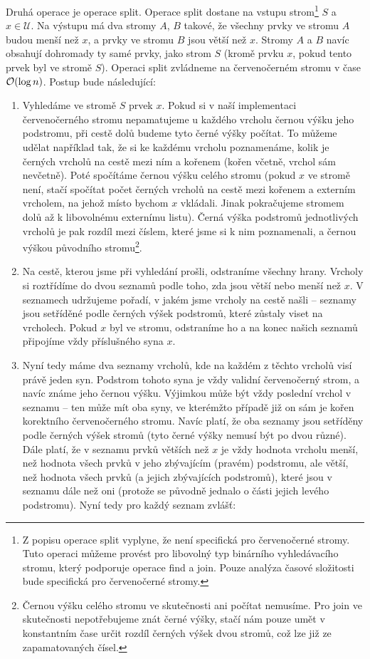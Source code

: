 Druhá operace je operace split. Operace split dostane na vstupu strom\footnote{Z popisu operace split vyplyne, že není specifická pro červenočerné stromy. Tuto operaci můžeme provést pro libovolný typ binárního vyhledávacího stromu, který podporuje operace find a join. Pouze analýza časové složitosti bude specifická pro červenočerné stromy.} $S$ a $x\in \mathcal U$. Na výstupu má dva stromy $A$, $B$ takové, že všechny prvky ve stromu $A$ budou menší než $x$, a prvky ve stromu $B$ jsou větší než $x$. Stromy $A$ a $B$ navíc obsahují dohromady ty samé prvky, jako strom $S$ (kromě prvku $x$, pokud tento prvek byl ve stromě $S$). Operaci split zvládneme na červenočerném stromu v čase $\mathcal O(\log n)$. Postup bude následující:

\begin{enumerate}

\item Vyhledáme ve stromě $S$ prvek $x$. Pokud si v naší implementaci
červenočerného stromu nepamatujeme u každého vrcholu černou výšku jeho
podstromu, při cestě dolů budeme tyto černé výšky počítat. To můžeme udělat
například tak, že si ke každému vrcholu poznamenáme, kolik je černých vrcholů
na cestě mezi ním a kořenem (kořen včetně, vrchol sám nevčetně). Poté spočítáme
černou výšku celého stromu (pokud $x$ ve stromě není, stačí spočítat počet
černých vrcholů na cestě mezi kořenem a externím vrcholem, na jehož místo
bychom $x$ vkládali. Jinak pokračujeme stromem dolů až k libovolnému externímu
listu). Černá výška podstromů jednotlivých vrcholů je pak rozdíl mezi číslem,
které jsme si k nim poznamenali, a černou výškou původního
stromu\footnote{Černou výšku celého stromu ve skutečnosti ani počítat nemusíme.
Pro join ve skutečnosti nepotřebujeme znát černé výšky, stačí nám pouze umět v
konstantním čase určit rozdíl černých výšek dvou stromů, což lze již ze
zapamatovaných čísel.}.

\item Na cestě, kterou jsme při vyhledání prošli, odstraníme všechny hrany.
Vrcholy si roztřídíme do dvou seznamů podle toho, zda jsou větší nebo menší než
$x$. V seznamech udržujeme pořadí, v jakém jsme vrcholy na cestě našli --
seznamy jsou setříděné podle černých výšek podstromů, které zůstaly viset na
vrcholech. Pokud $x$ byl ve stromu, odstraníme ho a na konec našich seznamů
připojíme vždy příslušného syna $x$.

\item Nyní tedy máme dva seznamy vrcholů, kde na každém z těchto vrcholů visí
právě jeden syn. Podstrom tohoto syna je vždy validní červenočerný strom, a
navíc známe jeho černou výšku. Výjimkou může být vždy poslední vrchol v seznamu
-- ten může mít oba syny, ve kterémžto případě již on sám je kořen korektního
červenočerného stromu. Navíc platí, že oba seznamy jsou setříděny podle černých výšek stromů (tyto černé výšky nemusí být po dvou různé). Dále platí, že v seznamu prvků větších než $x$ je vždy hodnota vrcholu menší, než hodnota všech prvků v jeho zbývajícím (pravém) podstromu, ale větší, než hodnota všech prvků (a jejich zbývajících podstromů), které jsou v seznamu dále než oni (protože se původně jednalo o části jejich levého podstromu). Nyní tedy pro každý seznam zvlášť:


\end{enumerate}
